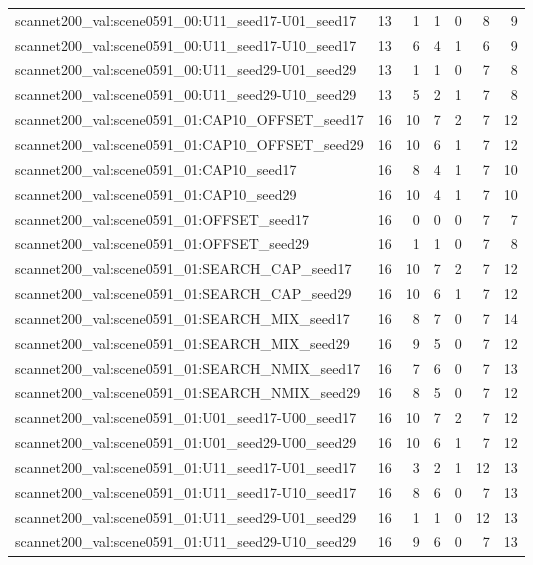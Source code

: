 \begin{table}[t]
\begin{tabular}{lrrrrrr}
scannet200\_val:scene0591\_00:U11\_seed17-U01\_seed17 & 13 & 1 & 1 & 0 & 8 & 9 \\
scannet200\_val:scene0591\_00:U11\_seed17-U10\_seed17 & 13 & 6 & 4 & 1 & 6 & 9 \\
scannet200\_val:scene0591\_00:U11\_seed29-U01\_seed29 & 13 & 1 & 1 & 0 & 7 & 8 \\
scannet200\_val:scene0591\_00:U11\_seed29-U10\_seed29 & 13 & 5 & 2 & 1 & 7 & 8 \\
scannet200\_val:scene0591\_01:CAP10\_OFFSET\_seed17 & 16 & 10 & 7 & 2 & 7 & 12 \\
scannet200\_val:scene0591\_01:CAP10\_OFFSET\_seed29 & 16 & 10 & 6 & 1 & 7 & 12 \\
scannet200\_val:scene0591\_01:CAP10\_seed17 & 16 & 8 & 4 & 1 & 7 & 10 \\
scannet200\_val:scene0591\_01:CAP10\_seed29 & 16 & 10 & 4 & 1 & 7 & 10 \\
scannet200\_val:scene0591\_01:OFFSET\_seed17 & 16 & 0 & 0 & 0 & 7 & 7 \\
scannet200\_val:scene0591\_01:OFFSET\_seed29 & 16 & 1 & 1 & 0 & 7 & 8 \\
scannet200\_val:scene0591\_01:SEARCH\_CAP\_seed17 & 16 & 10 & 7 & 2 & 7 & 12 \\
scannet200\_val:scene0591\_01:SEARCH\_CAP\_seed29 & 16 & 10 & 6 & 1 & 7 & 12 \\
scannet200\_val:scene0591\_01:SEARCH\_MIX\_seed17 & 16 & 8 & 7 & 0 & 7 & 14 \\
scannet200\_val:scene0591\_01:SEARCH\_MIX\_seed29 & 16 & 9 & 5 & 0 & 7 & 12 \\
scannet200\_val:scene0591\_01:SEARCH\_NMIX\_seed17 & 16 & 7 & 6 & 0 & 7 & 13 \\
scannet200\_val:scene0591\_01:SEARCH\_NMIX\_seed29 & 16 & 8 & 5 & 0 & 7 & 12 \\
scannet200\_val:scene0591\_01:U01\_seed17-U00\_seed17 & 16 & 10 & 7 & 2 & 7 & 12 \\
scannet200\_val:scene0591\_01:U01\_seed29-U00\_seed29 & 16 & 10 & 6 & 1 & 7 & 12 \\
scannet200\_val:scene0591\_01:U11\_seed17-U01\_seed17 & 16 & 3 & 2 & 1 & 12 & 13 \\
scannet200\_val:scene0591\_01:U11\_seed17-U10\_seed17 & 16 & 8 & 6 & 0 & 7 & 13 \\
scannet200\_val:scene0591\_01:U11\_seed29-U01\_seed29 & 16 & 1 & 1 & 0 & 12 & 13 \\
scannet200\_val:scene0591\_01:U11\_seed29-U10\_seed29 & 16 & 9 & 6 & 0 & 7 & 13 \\

\end{tabular}
\end{table}
